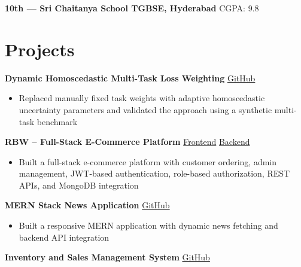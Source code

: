 \documentclass[a4paper,10.5pt]{article}
\begin{document}
\vspace{2.5pt}

\noindent
\textbf{10th — Sri Chaitanya School TGBSE, Hyderabad}
\hfill
CGPA: 9.8


\section{Projects}

\noindent
\textbf{Dynamic Homoscedastic Multi-Task Loss Weighting}
\hfill
\href{https://github.com/AP24110010250/Dynamic-Homoscedastic-Multi-Task-Loss-Weighting.git}{GitHub}

\begin{itemize}
\item Replaced manually fixed task weights with adaptive homoscedastic uncertainty parameters and validated the approach using a synthetic multi-task benchmark
\end{itemize}

\vspace{2.5pt}

\noindent
\textbf{RBW -- Full-Stack E-Commerce Platform}
\hfill
\href{https://github.com/rajyalaxmiidsolutions/rbwfrontend.git}{Frontend}
\hspace{0.4em}
\href{https://github.com/rajyalaxmiidsolutions/rbwbackend.git}{Backend}

\begin{itemize}
\item Built a full-stack e-commerce platform with customer ordering, admin management, JWT-based authentication, role-based authorization, REST APIs, and MongoDB integration
\end{itemize}

\vspace{2.5pt}

\noindent
\textbf{MERN Stack News Application}
\hfill
\href{https://github.com/AP24110010250/mern-stack-news-application.git}{GitHub}

\begin{itemize}
\item Built a responsive MERN application with dynamic news fetching and backend API integration
\end{itemize}

\vspace{2.5pt}

\noindent
\textbf{Inventory and Sales Management System}
\hfill
\href{https://github.com/AP24110010250/inventory-and-sales-management-system.git}{GitHub}
\end{document}
